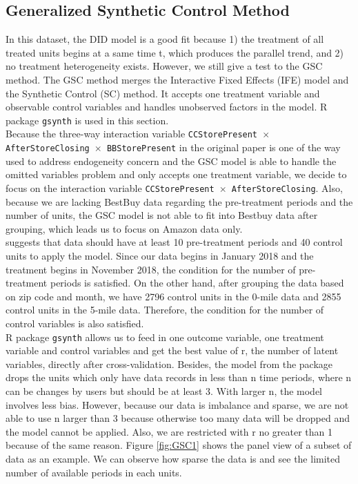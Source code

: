 \documentclass{article}
\begin{document}
\subsection{Generalized Synthetic Control Method}
In this dataset, the DID model is a good fit because 1) the treatment of all treated units begins at a same time t, which produces the parallel trend, and 2) no treatment heterogeneity exists. However, we still give a test to the GSC method. The GSC method merges the Interactive Fixed Effects (IFE) model and the Synthetic Control (SC) method. It accepts one treatment variable and observable control variables and handles unobserved factors in the model. R package \texttt{gsynth} is used in this section.\\
Because the three-way interaction variable \texttt{CCStorePresent $\times$ AfterStoreClosing $\times$ BBStorePresent} in the original paper is one of the way used to address endogeneity concern and the GSC model is able to handle the omitted variables problem and only accepts one treatment variable, we decide to focus on the interaction variable \texttt{CCStorePresent $\times$ AfterStoreClosing}. Also, because we are lacking BestBuy data regarding the pre-treatment periods and the number of units, the GSC model is not able to fit into Bestbuy data after grouping, which leads us to focus on Amazon data only. \\
\cite{xu2017generalized} suggests that data should have at least 10 pre-treatment periods and 40 control units to apply the model. Since our data begins in January 2018 and the treatment begins in November 2018, the condition for the number of pre-treatment periods is satisfied. On the other hand, after grouping the data based on zip code and month, we have 2796 control units in the 0-mile data and 2855 control units in the 5-mile data. Therefore, the condition for the number of control variables is also satisfied. \\
R package \texttt{gsynth} allows us to feed in one outcome variable, one treatment variable and control variables and get the best value of r, the number of latent variables, directly after cross-validation. Besides, the model from the package drops the units which only have data records in less than n time periods, where n can be changes by users but should be at least 3. With larger n, the model involves less bias. However, because our data is imbalance and sparse, we are not able to use n larger than 3 because otherwise too many data will be dropped and the model cannot be applied. Also, we are restricted with r no greater than 1 because of the same reason. Figure \ref{fig:GSC1} shows the panel view of a subset of data as an example. We can observe how sparse the data is and see the limited number of available periods in each units. 
\end{document}
